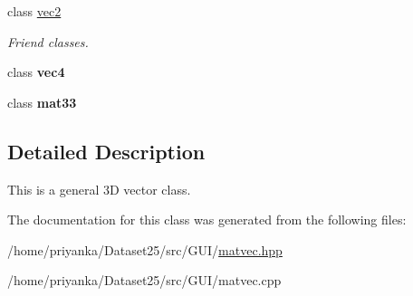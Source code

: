{\bf }\par
\begin{DoxyCompactItemize}
\item 
\hypertarget{classutil_1_1math_1_1vec3_a15a2529e420e1a5cb94508d6a5a57d1e}{class \hyperlink{classutil_1_1math_1_1vec3_a15a2529e420e1a5cb94508d6a5a57d1e}{vec2}}\label{classutil_1_1math_1_1vec3_a15a2529e420e1a5cb94508d6a5a57d1e}

\begin{DoxyCompactList}\small\item\em \-Friend classes. \end{DoxyCompactList}\item 
\hypertarget{classutil_1_1math_1_1vec3_aa6e6ead6159bde48f1607d4208122d9d}{class {\bfseries vec4}}\label{classutil_1_1math_1_1vec3_aa6e6ead6159bde48f1607d4208122d9d}

\item 
\hypertarget{classutil_1_1math_1_1vec3_a8e304e17586e44a87b8c0622e8d66e10}{class {\bfseries mat33}}\label{classutil_1_1math_1_1vec3_a8e304e17586e44a87b8c0622e8d66e10}

\end{DoxyCompactItemize}



\subsection{\-Detailed \-Description}
\-This is a general 3\-D vector class. 

\-The documentation for this class was generated from the following files\-:\begin{DoxyCompactItemize}
\item 
/home/priyanka/\-Dataset25/src/\-G\-U\-I/\hyperlink{matvec_8hpp}{matvec.\-hpp}\item 
/home/priyanka/\-Dataset25/src/\-G\-U\-I/matvec.\-cpp\end{DoxyCompactItemize}
